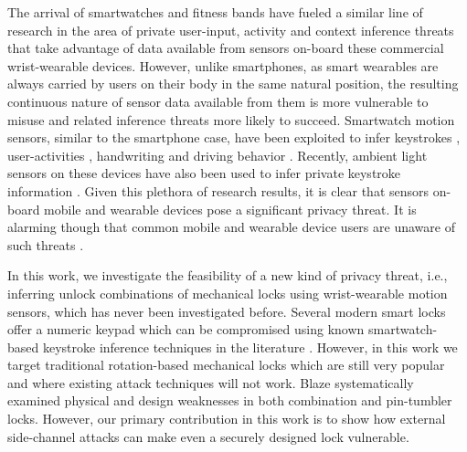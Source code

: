 \documentclass[]{IEEEtran}
\begin{document}
The arrival of smartwatches and fitness bands have fueled a similar line of research in the area of private user-input, activity and context inference threats that take advantage of data available from sensors on-board these commercial wrist-wearable devices. However, unlike smartphones, as smart wearables are always carried by users on their body in the same natural position, the resulting continuous nature of sensor data available from them is more vulnerable to misuse and related inference threats more likely to succeed. Smartwatch motion sensors, similar to the smartphone case, have been exploited to infer keystrokes \cite{maiti2015,wang2015,liu2015good,maiti2016smartwatch,wang2016friend}, user-activities \cite{shoaib2016complex,liu2016complex}, handwriting \cite{xu2015finger,wen2016serendipity} and driving behavior \cite{karatas2016leveraging}. Recently, ambient light sensors on these devices have also been used to infer private keystroke information \cite{holmes2016luxleak}. Given this plethora of research results, it is clear that sensors on-board mobile and wearable devices pose a significant privacy threat. It is alarming though that common mobile and wearable device users are unaware of such threats \cite{CragerMJH:2017}. 

In this work, we
investigate the feasibility of a new kind of privacy threat, i.e., inferring unlock combinations of mechanical locks using wrist-wearable motion sensors, which has never been investigated before.
Several modern smart locks offer a numeric keypad which can be compromised using known smartwatch-based keystroke inference techniques in the literature \cite{maiti2015,wang2015,liu2015good,maiti2016smartwatch,wang2016friend}. However, in this work we target traditional rotation-based mechanical locks which are still very popular and where existing attack techniques will not work. Blaze \cite{blaze2004safecracking,blaze2003rights} systematically examined physical and design weaknesses in both combination and pin-tumbler locks. However, our primary contribution in this work is to show how external side-channel attacks can make even a securely designed lock vulnerable. %
\end{document}
